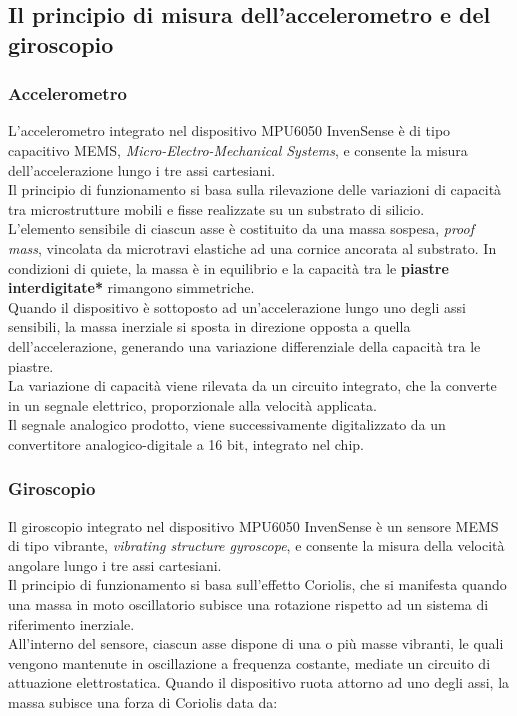 \documentclass[11pt]{report}
\begin{document}
\subsection{Il principio di misura dell'accelerometro e del giroscopio}
\subsubsection{Accelerometro}
L'accelerometro integrato nel dispositivo MPU6050 InvenSense è di tipo capacitivo MEMS, \textit{Micro-Electro-Mechanical Systems}, e consente la misura dell'accelerazione lungo i tre assi cartesiani.\\
Il principio di funzionamento si basa sulla rilevazione delle variazioni di capacità tra microstrutture mobili e fisse realizzate su un substrato di silicio.\\
L'elemento sensibile di ciascun asse è costituito da una massa sospesa, \textit{proof mass}, vincolata da microtravi elastiche ad una cornice ancorata al substrato.
In condizioni di quiete, la massa è in equilibrio e la capacità tra le \textbf{piastre interdigitate*} rimangono simmetriche.\\
Quando il dispositivo è sottoposto ad un'accelerazione lungo uno degli assi sensibili, la massa inerziale si sposta in direzione opposta a quella dell'accelerazione, generando una variazione differenziale 
della capacità tra le piastre.\\
La variazione di capacità viene rilevata da un circuito integrato, che la converte in un segnale elettrico, proporzionale alla velocità applicata.\\
Il segnale analogico prodotto, viene successivamente digitalizzato da un convertitore analogico-digitale a 16 bit, integrato nel chip.
\subsubsection{Giroscopio}
Il giroscopio integrato nel dispositivo MPU6050 InvenSense è un sensore MEMS di tipo vibrante, \textit{vibrating structure gyroscope}, e consente la misura della velocità angolare lungo i tre assi cartesiani.\\
Il principio di funzionamento si basa sull'effetto Coriolis, che si manifesta quando una massa in moto oscillatorio subisce una rotazione rispetto ad un sistema di riferimento inerziale.\\
All'interno del sensore, ciascun asse dispone di una o più masse vibranti, le quali vengono mantenute in oscillazione a frequenza costante, mediate un circuito di attuazione elettrostatica. Quando il dispositivo ruota attorno ad uno 
degli assi, la massa subisce una forza di Coriolis data da:
\end{document}

